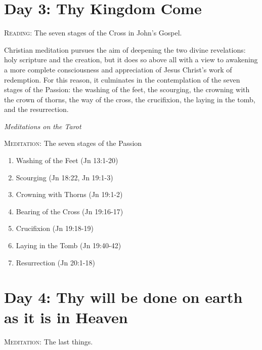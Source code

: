 \section{Day 3: Thy Kingdom Come}
\textsc{Reading:} The seven stages of the Cross in John's Gospel.

\begin{quotex}
Christian meditation pursues the aim of deepening the two divine revelations: holy scripture and the creation, but it
does so above all with a view to awakening a more complete consciousness and appreciation of Jesus
Christ's work of redemption. For this reason, it culminates in the contemplation of the seven
stages of the Passion: the washing of the feet, the scourging, the crowning with the crown of thorns, the way of the
cross, the crucifixion, the laying in the tomb, and the resurrection. 

\begin{flushright}\textit{Meditations on the Tarot}\end{flushright}

\end{quotex}
\textsc{Meditation}: The seven stages of the Passion

\begin{enumerate}
\item Washing of the Feet (Jn 13:1-20) 
\item Scourging (Jn 18:22, Jn 19:1-3) 
\item Crowning with Thorns (Jn 19:1-2) 
\item Bearing of the Cross (Jn 19:16-17) 
\item Crucifixion (Jn 19:18-19) 
\item Laying in the Tomb (Jn 19:40-42) 
\item Resurrection (Jn 20:1-18) 
\end{enumerate}

\section{Day 4: Thy will be done on earth as it is in Heaven}
\textsc{Meditation}: The last things.

